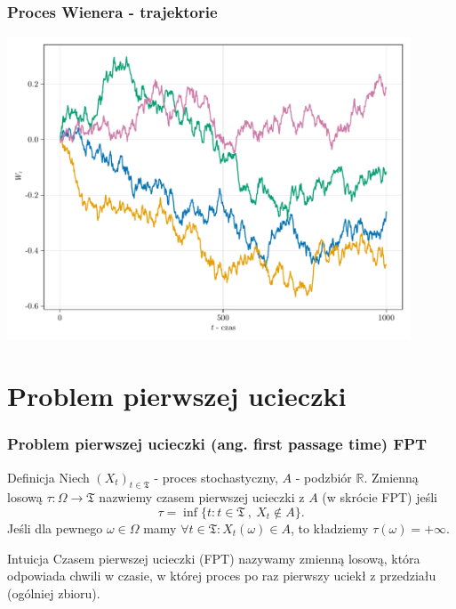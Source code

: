 \documentclass{beamer}
\newcommand{\R}{\mathbb{R}}
\newcommand{\1}{\mathbb{1}}
\newcommand{\Time}{\mathfrak{T}}
\begin{document}
\begin{frame}
\frametitle{Proces Wienera - trajektorie}
\includegraphics[width=0.9\textwidth]{wiener-sim/only-tr.pdf}
\end{frame}

\section{Problem pierwszej ucieczki}

\begin{frame}
\frametitle{Problem pierwszej ucieczki (ang. first passage time) FPT}
\begin{block}{Definicja}
Niech $(X_t)_{t \in \Time}$ - proces stochastyczny, $A$ - podzbiór $\R$. Zmienną losową $\tau: \Omega \to \Time$ nazwiemy czasem pierwszej ucieczki z $A$ (w skrócie FPT) jeśli
\begin{equation}
\tau = \inf{\{ t : t \in \Time~,~ X_t \notin A \}}.
\end{equation}
Jeśli dla pewnego $\omega \in \Omega$  mamy $\forall t \in \Time: X_t(\omega) \in A$, to kładziemy $\tau(\omega) = +\infty$.
\end{block}

\begin{block}{Intuicja}
Czasem pierwszej ucieczki (FPT) nazywamy zmienną losową, która odpowiada chwili w czasie, w której proces po raz pierwszy uciekł z przedziału (ogólniej zbioru).
\end{block}
\end{frame}
\end{document}
